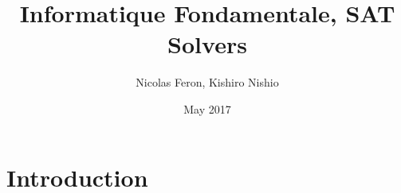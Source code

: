 \documentclass{article}
\title{Informatique Fondamentale, SAT Solvers}
\author{Nicolas Feron,  Kishiro Nishio }
\date{May 2017}
\begin{document}
\maketitle

\section{Introduction}
\end{document}
